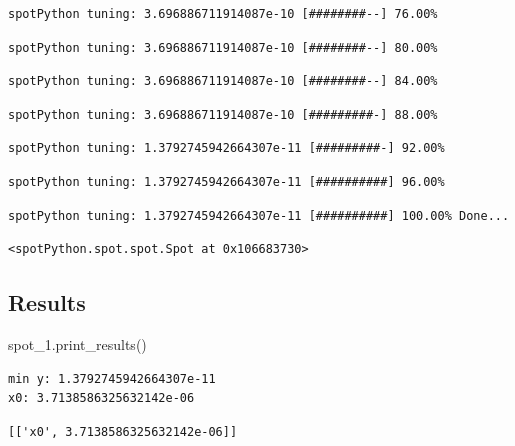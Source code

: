 \documentclass[
  letterpaper,
  DIV=11,
  numbers=noendperiod]{scrreprt}
\newenvironment{Shaded}{\begin{snugshade}}{\end{snugshade}}
\newcommand{\NormalTok}[1]{\textcolor[rgb]{0.00,0.23,0.31}{#1}}
\begin{document}
\begin{verbatim}
spotPython tuning: 3.696886711914087e-10 [########--] 76.00% 
\end{verbatim}

\begin{verbatim}
spotPython tuning: 3.696886711914087e-10 [########--] 80.00% 
\end{verbatim}

\begin{verbatim}
spotPython tuning: 3.696886711914087e-10 [########--] 84.00% 
\end{verbatim}

\begin{verbatim}
spotPython tuning: 3.696886711914087e-10 [#########-] 88.00% 
\end{verbatim}

\begin{verbatim}
spotPython tuning: 1.3792745942664307e-11 [#########-] 92.00% 
\end{verbatim}

\begin{verbatim}
spotPython tuning: 1.3792745942664307e-11 [##########] 96.00% 
\end{verbatim}

\begin{verbatim}
spotPython tuning: 1.3792745942664307e-11 [##########] 100.00% Done...
\end{verbatim}

\begin{verbatim}
<spotPython.spot.spot.Spot at 0x106683730>
\end{verbatim}

\hypertarget{results-3}{%
\subsection{Results}\label{results-3}}

\begin{Shaded}
\begin{Highlighting}[]
\NormalTok{spot\_1.print\_results()}
\end{Highlighting}
\end{Shaded}

\begin{verbatim}
min y: 1.3792745942664307e-11
x0: 3.7138586325632142e-06
\end{verbatim}

\begin{verbatim}
[['x0', 3.7138586325632142e-06]]
\end{verbatim}
\end{document}
